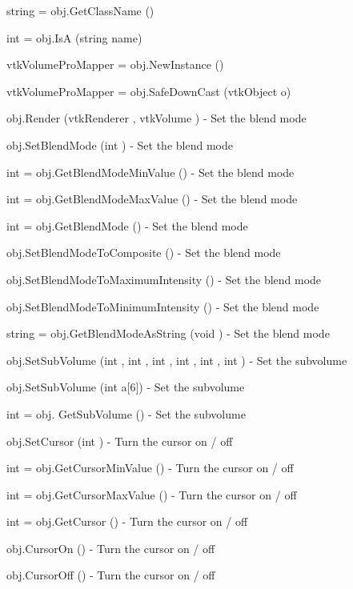 \begin{DoxyItemize}
\item {\ttfamily string = obj.\-Get\-Class\-Name ()}  
\item {\ttfamily int = obj.\-Is\-A (string name)}  
\item {\ttfamily vtk\-Volume\-Pro\-Mapper = obj.\-New\-Instance ()}  
\item {\ttfamily vtk\-Volume\-Pro\-Mapper = obj.\-Safe\-Down\-Cast (vtk\-Object o)}  
\item {\ttfamily obj.\-Render (vtk\-Renderer , vtk\-Volume )} -\/ Set the blend mode  
\item {\ttfamily obj.\-Set\-Blend\-Mode (int )} -\/ Set the blend mode  
\item {\ttfamily int = obj.\-Get\-Blend\-Mode\-Min\-Value ()} -\/ Set the blend mode  
\item {\ttfamily int = obj.\-Get\-Blend\-Mode\-Max\-Value ()} -\/ Set the blend mode  
\item {\ttfamily int = obj.\-Get\-Blend\-Mode ()} -\/ Set the blend mode  
\item {\ttfamily obj.\-Set\-Blend\-Mode\-To\-Composite ()} -\/ Set the blend mode  
\item {\ttfamily obj.\-Set\-Blend\-Mode\-To\-Maximum\-Intensity ()} -\/ Set the blend mode  
\item {\ttfamily obj.\-Set\-Blend\-Mode\-To\-Minimum\-Intensity ()} -\/ Set the blend mode  
\item {\ttfamily string = obj.\-Get\-Blend\-Mode\-As\-String (void )} -\/ Set the blend mode  
\item {\ttfamily obj.\-Set\-Sub\-Volume (int , int , int , int , int , int )} -\/ Set the subvolume  
\item {\ttfamily obj.\-Set\-Sub\-Volume (int a\mbox{[}6\mbox{]})} -\/ Set the subvolume  
\item {\ttfamily int = obj. Get\-Sub\-Volume ()} -\/ Set the subvolume  
\item {\ttfamily obj.\-Set\-Cursor (int )} -\/ Turn the cursor on / off  
\item {\ttfamily int = obj.\-Get\-Cursor\-Min\-Value ()} -\/ Turn the cursor on / off  
\item {\ttfamily int = obj.\-Get\-Cursor\-Max\-Value ()} -\/ Turn the cursor on / off  
\item {\ttfamily int = obj.\-Get\-Cursor ()} -\/ Turn the cursor on / off  
\item {\ttfamily obj.\-Cursor\-On ()} -\/ Turn the cursor on / off  
\item {\ttfamily obj.\-Cursor\-Off ()} -\/ Turn the cursor on / off  

\end{DoxyItemize}
